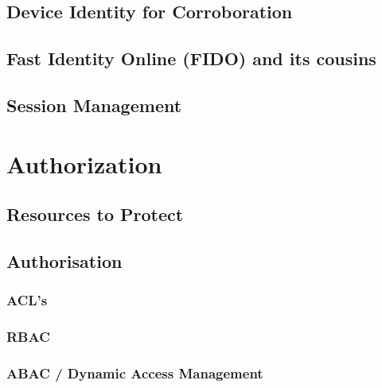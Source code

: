 \hypertarget{device-identity-for-corroboration}{%
\subsection{Device Identity for
Corroboration}\label{device-identity-for-corroboration}}

\hypertarget{fast-identity-online-fido-and-its-cousins}{%
\subsection{Fast Identity Online (FIDO) and its
cousins}\label{fast-identity-online-fido-and-its-cousins}}

\hypertarget{session-management}{%
\subsection{Session Management}\label{session-management}}

\hypertarget{authorization}{%
\section{Authorization}\label{authorization}}

\hypertarget{resources-to-protect}{%
\subsection{Resources to Protect}\label{resources-to-protect}}

\hypertarget{authorisation}{%
\subsection{Authorisation}\label{authorisation}}

\hypertarget{acls}{%
\subsubsection{ACL's}\label{acls}}

\hypertarget{rbac}{%
\subsubsection{RBAC}\label{rbac}}

\hypertarget{abac-dynamic-access-management}{%
\subsubsection{ABAC / Dynamic Access
Management}\label{abac-dynamic-access-management}}

